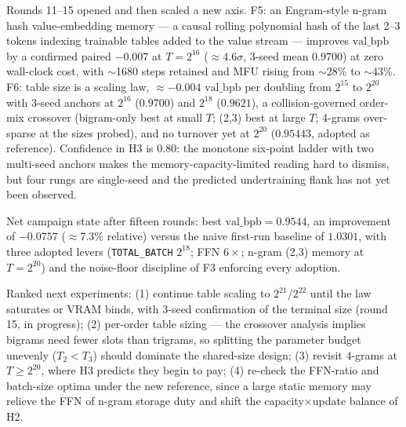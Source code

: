 \documentclass{article}
\newcommand{\valbpb}{\mathrm{val\_bpb}}
\begin{document}
Rounds 11--15 opened and then scaled a new axis. F5: an Engram-style n-gram hash value-embedding memory --- a causal rolling polynomial hash of the last 2--3 tokens indexing trainable tables added to the value stream --- improves $\valbpb$ by a confirmed paired $-0.007$ at $T = 2^{16}$ ($\approx 4.6\sigma$, 3-seed mean $0.9700$) at zero wall-clock cost, with $\sim$1680 steps retained and MFU rising from $\sim$28\% to $\sim$43\%. F6: table size is a scaling law, $\approx -0.004$ $\valbpb$ per doubling from $2^{15}$ to $2^{20}$ with 3-seed anchors at $2^{16}$ ($0.9700$) and $2^{18}$ ($0.9621$), a collision-governed order-mix crossover (bigram-only best at small $T$; (2,3) best at large $T$; 4-grams over-sparse at the sizes probed), and no turnover yet at $2^{20}$ ($0.95443$, adopted as reference). Confidence in H3 is $0.80$: the monotone six-point ladder with two multi-seed anchors makes the memory-capacity-limited reading hard to dismiss, but four rungs are single-seed and the predicted undertraining flank has not yet been observed.

Net campaign state after fifteen rounds: best $\valbpb = 0.9544$, an improvement of $-0.0757$ ($\approx$7.3\% relative) versus the naive first-run baseline of $1.0301$, with three adopted levers (\texttt{TOTAL\_BATCH} $2^{18}$; FFN $6\times$; n-gram (2,3) memory at $T = 2^{20}$) and the noise-floor discipline of F3 enforcing every adoption.

Ranked next experiments: (1) continue table scaling to $2^{21}$/$2^{22}$ until the law saturates or VRAM binds, with 3-seed confirmation of the terminal size (round 15, in progress); (2) per-order table sizing --- the crossover analysis implies bigrams need fewer slots than trigrams, so splitting the parameter budget unevenly ($T_2 < T_3$) should dominate the shared-size design; (3) revisit 4-grams at $T \geq 2^{20}$, where H3 predicts they begin to pay; (4) re-check the FFN-ratio and batch-size optima under the new reference, since a large static memory may relieve the FFN of n-gram storage duty \cite{geva2021kv} and shift the capacity$\times$update balance of H2.


\end{document}
